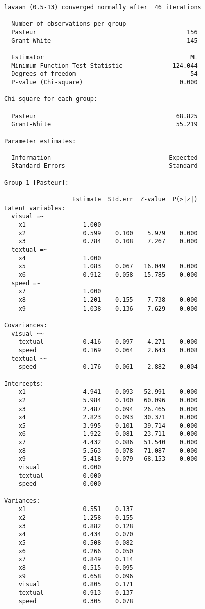 \begin{verbatim}
lavaan (0.5-13) converged normally after  46 iterations

  Number of observations per group         
  Pasteur                                          156
  Grant-White                                      145

  Estimator                                         ML
  Minimum Function Test Statistic              124.044
  Degrees of freedom                                54
  P-value (Chi-square)                           0.000

Chi-square for each group:

  Pasteur                                       68.825
  Grant-White                                   55.219

Parameter estimates:

  Information                                 Expected
  Standard Errors                             Standard

Group 1 [Pasteur]:

                   Estimate  Std.err  Z-value  P(>|z|)
Latent variables:
  visual =~
    x1                1.000
    x2                0.599    0.100    5.979    0.000
    x3                0.784    0.108    7.267    0.000
  textual =~
    x4                1.000
    x5                1.083    0.067   16.049    0.000
    x6                0.912    0.058   15.785    0.000
  speed =~
    x7                1.000
    x8                1.201    0.155    7.738    0.000
    x9                1.038    0.136    7.629    0.000

Covariances:
  visual ~~
    textual           0.416    0.097    4.271    0.000
    speed             0.169    0.064    2.643    0.008
  textual ~~
    speed             0.176    0.061    2.882    0.004

Intercepts:
    x1                4.941    0.093   52.991    0.000
    x2                5.984    0.100   60.096    0.000
    x3                2.487    0.094   26.465    0.000
    x4                2.823    0.093   30.371    0.000
    x5                3.995    0.101   39.714    0.000
    x6                1.922    0.081   23.711    0.000
    x7                4.432    0.086   51.540    0.000
    x8                5.563    0.078   71.087    0.000
    x9                5.418    0.079   68.153    0.000
    visual            0.000
    textual           0.000
    speed             0.000

Variances:
    x1                0.551    0.137
    x2                1.258    0.155
    x3                0.882    0.128
    x4                0.434    0.070
    x5                0.508    0.082
    x6                0.266    0.050
    x7                0.849    0.114
    x8                0.515    0.095
    x9                0.658    0.096
    visual            0.805    0.171
    textual           0.913    0.137
    speed             0.305    0.078




\end{verbatim}
